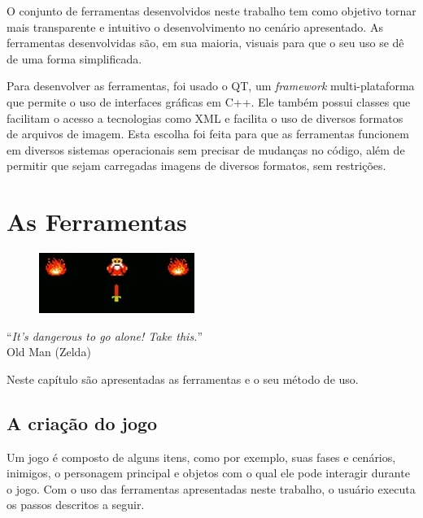 \documentclass[brazil]{abnt}
\begin{document}
O conjunto de ferramentas desenvolvidos neste trabalho tem como objetivo tornar mais transparente e intuitivo o desenvolvimento no cenário apresentado. As ferramentas desenvolvidas são, em sua maioria, visuais para que o seu uso se dê de uma forma simplificada.


Para desenvolver as ferramentas, foi usado o QT, um \textit{framework} multi-plataforma que permite o uso de interfaces gráficas em C++. Ele também possui classes que facilitam o acesso a tecnologias como XML e facilita o uso de diversos formatos de arquivos de imagem. Esta escolha foi feita para que as ferramentas funcionem em diversos sistemas operacionais sem precisar de mudanças no código, além de permitir que sejam carregadas imagens de diversos formatos, sem restrições.

\chapter{As Ferramentas\label{cap:ferramentas}}

\vfill{}
\begin{flushright}{}
\begin{figure}[h!]
\hfill\includegraphics{imgs/oldman.jpg}
\end{figure}
``\emph{It's dangerous to go alone! Take this.}''\\
{\small Old Man (Zelda)}\end{flushright}{\small \par}
\vfill{}

Neste capítulo são apresentadas as ferramentas e o seu método de uso.
\newpage

\section{A criação do jogo\label{sec:workflow}}

Um jogo é composto de alguns itens, como por exemplo, suas fases e cenários, inimigos,  o personagem principal e objetos com o qual ele pode interagir durante o jogo. Com o uso das ferramentas apresentadas neste trabalho, o usuário executa os passos descritos a seguir.
\end{document}
